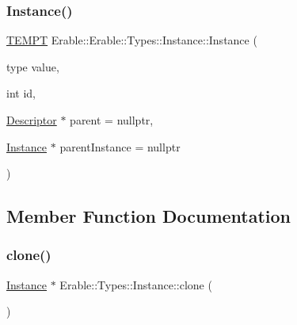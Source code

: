 \subsubsection{\texorpdfstring{Instance()}{Instance()}\hspace{0.1cm}{\footnotesize\ttfamily [2/2]}}
{\footnotesize\ttfamily \mbox{\hyperlink{_v_m_global_8hpp_af309683c0c7b45cf126c8742c4251511}{T\+E\+M\+PT}} Erable\+::\+Erable\+::\+Types\+::\+Instance\+::\+Instance (\begin{DoxyParamCaption}\item[{type}]{value,  }\item[{int}]{id,  }\item[{\mbox{\hyperlink{class_erable_1_1_descriptor}{Descriptor}} $\ast$}]{parent = {\ttfamily nullptr},  }\item[{\mbox{\hyperlink{class_erable_1_1_erable_1_1_types_1_1_instance}{Instance}} $\ast$}]{parent\+Instance = {\ttfamily nullptr} }\end{DoxyParamCaption})\hspace{0.3cm}{\ttfamily [inline]}}



\subsection{Member Function Documentation}
\mbox{\label{class_erable_1_1_erable_1_1_types_1_1_instance_a87d644219b7d4706a94c0845a31bbbcc}} 
\subsubsection{\texorpdfstring{clone()}{clone()}}
{\footnotesize\ttfamily \mbox{\hyperlink{class_erable_1_1_erable_1_1_types_1_1_instance}{Instance}} $\ast$ Erable\+::\+Types\+::\+Instance\+::clone (\begin{DoxyParamCaption}{ }\end{DoxyParamCaption})\hspace{0.3cm}{\ttfamily [virtual]}}

\mbox{\label{class_erable_1_1_erable_1_1_types_1_1_instance_a038523b9fe697b442d777a4b2010ce4e}} 
